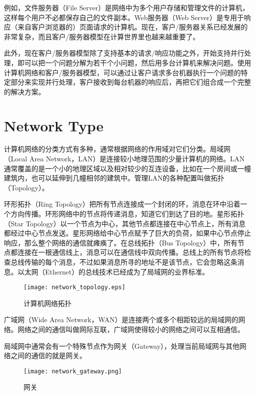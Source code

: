 例如，文件服务器（File Server）是网络中为多个用户存储和管理文件的计算机，这样每个用户不必都保存自己的文件副本。Web服务器（Web Server）是专用于响应（来自客户浏览器的）页面请求的计算机。现在，客户/服务器关系已经发展的非常复杂，而且客户/服务器模型在计算世界里也越来越重要了。

此外，现在客户/服务器模型除了支持基本的请求/响应功能之外，开始支持并行处理，即可以把一个问题分解为若干个小问题，然后用多台计算机来解决问题。使用计算机网络和客户/服务器模型，可以通过让客户请求多台机器执行一个问题的特定部分来实现并行处理，客户接收到每台机器的响应后，再把它们组合成一个完整的解决方案。

\section{Network Type}

计算机网络的分类方式有多种，通常根据网络的作用域对它们分类。局域网（Local Area Network，LAN）是连接较小地理范围的少量计算机的网络。LAN通常覆盖的是一个小的地理区域以及相对较少的互连设备，比如在一个房间或一幢建筑内，也可以延伸到几幢相邻的建筑中。管理LAN的各种配置叫做拓扑（Topology）。

环形拓扑（Ring Topology）把所有节点连接成一个封闭的环，消息在环中沿着一个方向传播。环形网络中的节点将传递消息，知道它们到达了目的地。星形拓扑（Star Topology）以一个节点为中心，其他节点都连接在中心节点上，所有消息都经过中心节点发送。星形网络给中心节点赋予了巨大的负荷，如果中心节点停止响应，那么整个网络的通信就瘫痪了。在总线拓扑（Bus Topology）中，所有节点都连接在一根通信线上，消息可以在通信线中双向传播。总线上的所有节点将检查总线传输的每个消息，不过如果消息所寻的地址不是该节点，它会忽略这条消息。以太网（Ethernet）的总线技术已经成为了局域网的业界标准。

\begin{figure}[!h]
\centering
\texttt{[image: network\_topology.eps]}
\caption{计算机网络拓扑}
\label{network_topology}
\end{figure}


广域网（Wide Area Network，WAN）是连接两个或多个相距较远的局域网的网络。网络之间的通信叫做网际互联，广域网使得较小的网络之间可以互相通信。

局域网中通常会有一个特殊节点作为网关（Gateway），处理当前局域网与其他网络之间的通信的就是网关。

\begin{figure}[!h]
\centering
\texttt{[image: network\_gateway.png]}
\caption{网关}
\label{network_gateway}
\end{figure}


